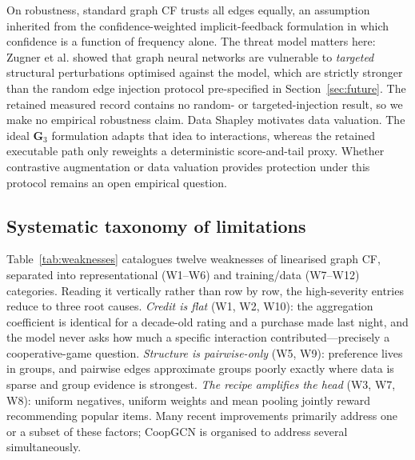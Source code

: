 \documentclass[a4paper,fleqn,longmktitle]{cas-dc}
\begin{document}
On robustness, standard graph CF trusts all edges equally, an assumption
inherited from the confidence-weighted implicit-feedback formulation
\citep{hu2008wrmf} in which confidence is a function of frequency alone. The
threat model matters here: Zugner et al. \citep{zugner2018adversarial} showed
that graph neural networks are vulnerable to \emph{targeted} structural
perturbations optimised against the model, which are strictly stronger than
the random edge injection protocol pre-specified in Section~\ref{sec:future}.
The retained measured record contains no random- or targeted-injection result,
so we make no empirical robustness claim. Data
Shapley \citep{ghorbani2019datashapley} motivates data valuation. The ideal
$\mathbf G_3$ formulation adapts that idea to interactions, whereas the
retained executable path only reweights a deterministic score-and-tail proxy. Whether contrastive augmentation or data valuation provides protection under
this protocol remains an open empirical question.

\subsection{Systematic taxonomy of limitations}
\label{sec:taxonomy}

Table~\ref{tab:weaknesses} catalogues twelve weaknesses of linearised graph
CF, separated into representational (W1--W6) and training/data (W7--W12)
categories. Reading it vertically rather than row by row, the high-severity
entries reduce to three root causes. \emph{Credit is flat} (W1, W2, W10): the
aggregation coefficient is identical for a decade-old rating and a purchase
made last night, and the model never asks how much a specific interaction
contributed---precisely a cooperative-game question. \emph{Structure is
pairwise-only} (W5, W9): preference lives in groups, and pairwise edges
approximate groups poorly exactly where data is sparse and group evidence is
strongest. \emph{The recipe amplifies the head} (W3, W7, W8): uniform
negatives, uniform weights and mean pooling jointly reward recommending
popular items. Many recent improvements primarily address one or a subset of
these factors; CoopGCN is organised to address several simultaneously.
\end{document}
